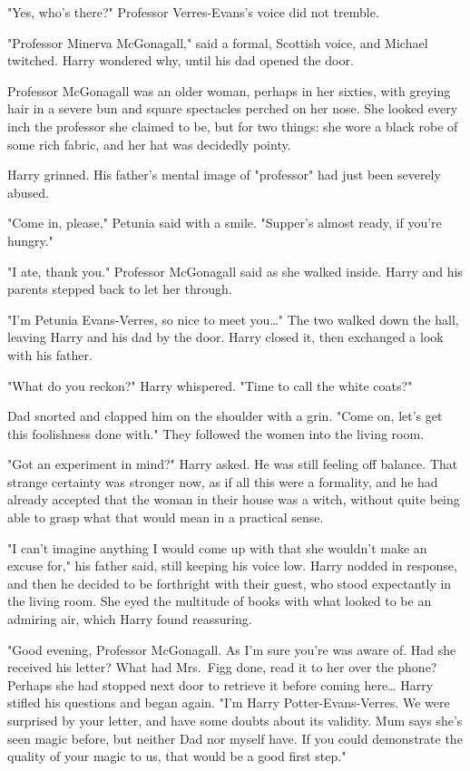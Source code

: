 "Yes, who's there?" Professor Verres-Evans's voice did not tremble.

"Professor Minerva McGonagall," said a formal, Scottish
voice, and Michael twitched. Harry wondered why, until his
dad opened the door.

Professor McGonagall was an older woman, perhaps in her
sixties, with greying hair in a severe bun and square
spectacles perched on her nose. She looked every inch
the professor she claimed to be, but for two things: she
wore a black robe of some rich fabric, and her hat was
decidedly pointy.

Harry grinned. His father's mental image of "professor" had
just been severely abused.

"Come in, please," Petunia said with a smile. "Supper's
almost ready, if you're hungry."

"I ate, thank you." Professor McGonagall said as she walked
inside. Harry and his parents stepped back to let her through.

"I'm Petunia Evans-Verres, so nice to meet you{\ldots}" The two
walked down the hall, leaving Harry and his dad by the
door. Harry closed it, then exchanged a look with his father.

"What do you reckon?" Harry whispered. "Time to call the white coats?"

Dad snorted and clapped him on the shoulder with a grin.
"Come on, let's get this foolishness done with." They
followed the women into the living room.

"Got an experiment in mind?" Harry asked. He was still
feeling off balance. That strange certainty was stronger
now, as if all this were a formality, and he had already
accepted that the woman in their house was a witch,
without quite being able to grasp what that would mean in
a practical sense.

"I can't imagine anything I would come up with that she
wouldn't make an excuse for," his father said, still keeping
his voice low. Harry nodded in response, and then he decided to be forthright
with their guest, who stood expectantly in the living room.
She eyed the multitude of books with what looked to be
an admiring air, which Harry found reassuring.

"Good evening, Professor McGonagall. As I'm sure you're
was aware of. Had she received his letter? What had Mrs.~Figg done,
read it to her over the phone? Perhaps she
had stopped next door to retrieve it before coming here{\ldots}
Harry stifled his questions and began again. "I'm Harry
Potter-Evans-Verres. We were surprised by your letter, and
have some doubts about its validity. Mum says she's seen
magic before, but neither Dad nor myself have. If you
could demonstrate the quality of your magic to us, that
would be a good first step."


